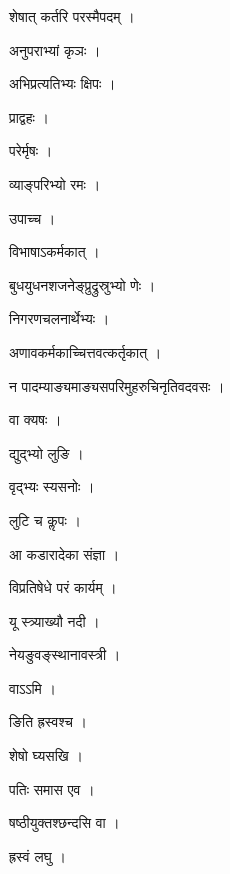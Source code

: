 \documentclass[10pt, openany]{book}
\begin{document}
\noindent शेषात् कर्तरि परस्मैपदम् ।

\noindent अनुपराभ्यां कृञः ।

\noindent अभिप्रत्यतिभ्यः क्षिपः ।

\noindent प्राद्वहः ।

\noindent परेर्मृषः ।

\noindent व्याङ्परिभ्यो रमः ।

\noindent उपाच्च ।

\noindent विभाषाऽकर्मकात् ।

\noindent बुधयुधनशजनेङ्प्रुद्रुस्रुभ्यो णेः ।

\noindent निगरणचलनार्थेभ्यः ।

\noindent अणावकर्मकाच्चित्तवत्कर्तृकात् ।

\noindent न पादम्याङ्यमाङ्यसपरिमुहरुचिनृतिवदवसः ।

\noindent वा क्यषः ।

\noindent द्युद्भ्यो लुङि ।

\noindent वृद्भ्यः स्यसनोः ।

\noindent लुटि च कॢपः ।

\noindent आ कडारादेका संज्ञा ।

\noindent विप्रतिषेधे परं कार्यम् ।

\noindent यू स्त्र्याख्यौ नदी ।

\noindent नेयङुवङ्स्थानावस्त्री ।

\noindent वाऽऽमि ।

\noindent ङिति ह्रस्वश्च ।

\noindent शेषो घ्यसखि ।

\noindent पतिः समास एव ।

\noindent षष्ठीयुक्तश्छन्दसि वा ।

\noindent ह्रस्वं लघु ।
\end{document}
